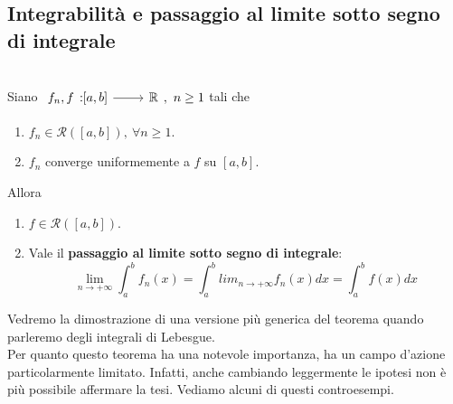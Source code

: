 \subsection{Integrabilità e passaggio al limite sotto segno di integrale}
\begin{theorema}~{}\\
	Siano $\funz{f_n,f}{\left[a,b\right]}{\realset},\ n\geq 1$ tali che
	\begin{enumerate}
		\item $f_n\in\mathcal{R}\left(\left[a,b\right]\right),\ \forall n\geq 1$.
		\item $f_n$ converge uniformemente a $f$ su $\left[a,b\right]$.
	\end{enumerate}
	Allora
	\begin{enumerate}
		\item $f\in\mathcal{R}\left(\left[a,b\right]\right)$.
		\item Vale il \textbf{passaggio al limite sotto segno di integrale}:
		\begin{equation}
			\lim_{n\to+\infty}\int_{a}^{b}f_n\left(x\right)=\int_{a}^{b}lim_{n\to+\infty}f_n\left(x\right)dx=\int_{a}^{b}f\left(x\right)dx
		\end{equation}
	\end{enumerate}
\end{theorema}
Vedremo la dimostrazione di una versione più generica del teorema quando parleremo degli integrali di Lebesgue.\\
Per quanto questo teorema ha una notevole importanza, ha un campo d'azione particolarmente limitato. Infatti, anche cambiando leggermente le ipotesi non è più possibile affermare la tesi. Vediamo alcuni di questi controesempi.
